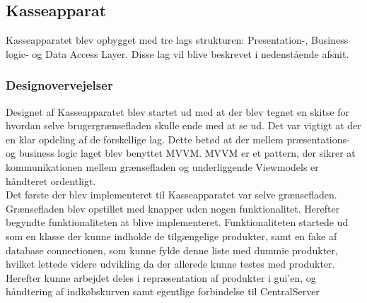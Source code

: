 \subsection{Kasseapparat}

Kasseapparatet blev opbygget med tre lags strukturen: Presentation-, Business logic- og Data Access Layer. Disse lag vil blive beskrevet i nedenstående afsnit.

\subsubsection{Designovervejelser}
Designet af Kasseapparatet blev startet ud med at der blev tegnet en skitse for hvordan selve brugergrænsefladen skulle ende med at se ud.
Det var vigtigt at der en klar opdeling af de forskellige lag. Dette betød at der mellem præsentations- og business logic laget blev benyttet MVVM. MVVM er et pattern, der sikrer at kommunikationen mellem grænsefladen og underliggende Viewmodels er håndteret ordentligt. \\
Det første der blev implementeret til Kasseapparatet var selve grænsefladen. Grænsefladen blev opstillet med knapper uden nogen funktionalitet. Herefter begyndte funktionaliteten at blive implementeret. Funktionaliteten startede ud som en klasse der kunne indholde de tilgængelige produkter, samt en fake af database connectionen, som kunne fylde denne liste med dummie produkter, hvilket lettede videre udvikling da der allerede kunne testes med produkter. Herefter kunne arbejdet deles i repræsentation af produkter i gui'en, og håndtering af indkøbskurven samt egentlige forbindelse til CentralServer





